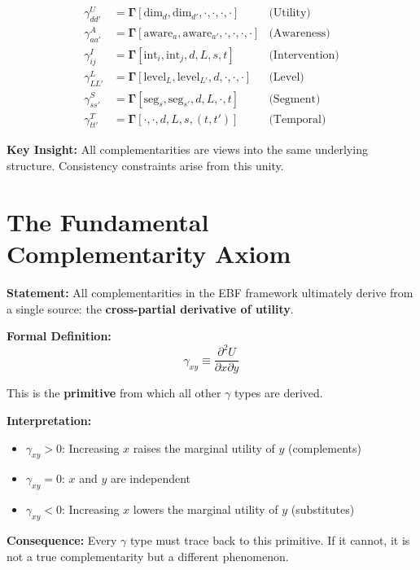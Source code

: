 \begin{align}
\gamma^U_{dd'} &= \boldsymbol{\Gamma}[\text{dim}_d, \text{dim}_{d'}, \cdot, \cdot, \cdot, \cdot]
    & \text{(Utility)} \\
\gamma^A_{aa'} &= \boldsymbol{\Gamma}[\text{aware}_a, \text{aware}_{a'}, \cdot, \cdot, \cdot, \cdot]
    & \text{(Awareness)} \\
\gamma^I_{ij} &= \boldsymbol{\Gamma}[\text{int}_i, \text{int}_j, d, L, s, t]
    & \text{(Intervention)} \\
\gamma^L_{LL'} &= \boldsymbol{\Gamma}[\text{level}_L, \text{level}_{L'}, d, \cdot, \cdot, \cdot]
    & \text{(Level)} \\
\gamma^S_{ss'} &= \boldsymbol{\Gamma}[\text{seg}_s, \text{seg}_{s'}, d, L, \cdot, t]
    & \text{(Segment)} \\
\gamma^T_{tt'} &= \boldsymbol{\Gamma}[\cdot, \cdot, d, L, s, (t, t')]
    & \text{(Temporal)}
\end{align}

\textbf{Key Insight:} All complementarities are views into the same underlying
structure. Consistency constraints arise from this unity.

\section{The Fundamental Complementarity Axiom}
\label{sec:gtc-axiom}

\begin{tcolorbox}[colback=blue!5!white, colframe=blue!75!black,
    title=Axiom UNMAPPED_GTC-1: The Source Axiom]

\textbf{Statement:} All complementarities in the EBF framework ultimately derive
from a single source: the \textbf{cross-partial derivative of utility}.

\textbf{Formal Definition:}
\begin{equation}
\boxed{
\gamma_{xy} \equiv \frac{\partial^2 U}{\partial x \partial y}
}
\end{equation}

This is the \textbf{primitive} from which all other $\gamma$ types are derived.

\textbf{Interpretation:}
\begin{itemize}[nosep]
    \item $\gamma_{xy} > 0$: Increasing $x$ raises the marginal utility of $y$ (complements)
    \item $\gamma_{xy} = 0$: $x$ and $y$ are independent
    \item $\gamma_{xy} < 0$: Increasing $x$ lowers the marginal utility of $y$ (substitutes)
\end{itemize}

\textbf{Consequence:} Every $\gamma$ type must trace back to this primitive.
If it cannot, it is not a true complementarity but a different phenomenon.

\end{tcolorbox}

